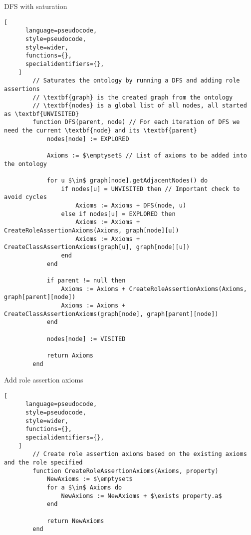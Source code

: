 \begin{programruledcaption}{DFS with saturation\label{prog:dfs}}
    \begin{lstlisting}[
      language=pseudocode,
      style=pseudocode,
      style=wider,
      functions={},
      specialidentifiers={},
    ]
        // Saturates the ontology by running a DFS and adding role assertions
        // \textbf{graph} is the created graph from the ontology
        // \textbf{nodes} is a global list of all nodes, all started as \textbf{UNVISITED}
        function DFS(parent, node) // For each iteration of DFS we need the current \textbf{node} and its \textbf{parent}
            nodes[node] := EXPLORED     

            Axioms := $\emptyset$ // List of axioms to be added into the ontology

            for u $\in$ graph[node].getAdjacentNodes() do
                if nodes[u] = UNVISITED then // Important check to avoid cycles
                    Axioms := Axioms + DFS(node, u)
                else if nodes[u] = EXPLORED then
                    Axioms := Axioms + CreateRoleAssertionAxioms(Axioms, graph[node][u])
                    Axioms := Axioms + CreateClassAssertionAxioms(graph[u], graph[node][u])
                end
            end

            if parent != null then
                Axioms := Axioms + CreateRoleAssertionAxioms(Axioms, graph[parent][node])
                Axioms := Axioms + CreateClassAssertionAxioms(graph[node], graph[parent][node])
            end

            nodes[node] := VISITED

            return Axioms
        end
    \end{lstlisting}
\end{programruledcaption}

\begin{programruledcaption}{Add role assertion axioms\label{prog:add-role-assertion-axioms}}
    \begin{lstlisting}[
      language=pseudocode,
      style=pseudocode,
      style=wider,
      functions={},
      specialidentifiers={},
    ]
        // Create role assertion axioms based on the existing axioms and the role specified
        function CreateRoleAssertionAxioms(Axioms, property) 
            NewAxioms := $\emptyset$
            for a $\in$ Axioms do
                NewAxioms := NewAxioms + $\exists property.a$
            end

            return NewAxioms
        end
    \end{lstlisting}
\end{programruledcaption}

